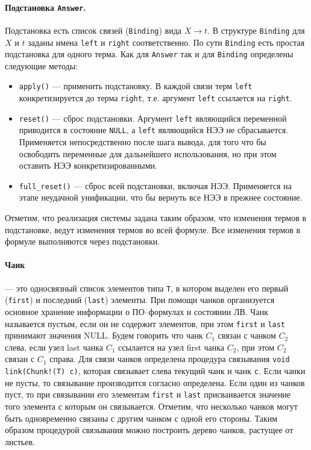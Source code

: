 \paragraph{Подстановка \texttt{Answer}.} Подстановка есть список связей (\texttt{Binding}) вида $X \rightarrow t$. В структуре \texttt{Binding} для $X$ и $t$ заданы имена \texttt{left} и \texttt{right} соответственно. По сути \texttt{Binding} есть простая подстановка для одного терма. Как для \texttt{Answer} так и для \texttt{Binding} определены следующие методы:
\begin{itemize}
\item{\texttt{apply()}} --- применить подстановку. В каждой связи терм \texttt{left} конкретизируется до терма \texttt{right}, т.е. аргумент \texttt{left} ссылается на \texttt{right}.
\item{\texttt{reset()}} --- сброс подстановки. Аргумент \texttt{left} являющийся переменной приводится в состояние \texttt{NULL}, а \texttt{left} являющийся НЭЭ не сбрасывается. Применяется непосредственно после шага вывода, для того что бы освободить переменные для дальнейшего использования, но при этом оставить НЭЭ конкретизированными.
\item{\texttt{full\_reset()}} --- сброс всей подстановки, включая НЭЭ. Применяется на этапе неудачной унификации, что бы вернуть все НЭЭ в прежнее состояние.
\end{itemize}

Отметим, что реализация системы задана таким образом, что изменения термов в подстановке, ведут изменения термов во всей формуле. Все изменения термов в формуле выполняются через подстановки.

\paragraph{Чанк} --- это односвязный список элементов типа {\tt T}, в котором выделен его первый ({\tt first}) и последний ({\tt last}) элементы. При помощи чанков организуется основное хранение информации о ПО--формулах и состоянии ЛВ. Чанк называется пустым, если он не содержит элементов, при этом \texttt{first} и \texttt{last} принимают значения NULL. Будем говорить что чанк $C_1$ связан с чанком $C_2$ слева, если узел last чанка $C_1$ ссылается на узел first чанка $C_2$, при этом $C_2$ связан с $C_1$ справа. Для связи чанков определена процедура связывания {\tt void link(Chunk!(T) c)}, которая связывает слева текущий чанк и чанк {\tt c}. Если чанки не пусты, то связывание производится согласно определена. Если один из чанков пуст, то при связывании его элементам \texttt{first} и \texttt{last} присваивается значение того элемента с которым он связывается. Отметим, что несколько чанков могут быть одновременно связаны с другим чанком с одной его стороны. Таким образом процедурой связывания можно построить дерево чанков, растущее от листьев.

